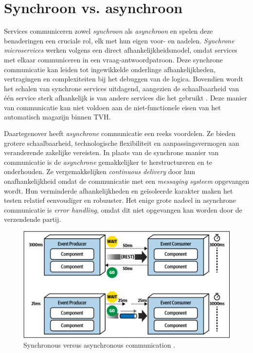 \section{Synchroon vs. asynchroon}
Services communiceren zowel \emph{synchroon} als \emph{asynchroon} en spelen deze benaderingen een cruciale rol, 
elk met hun eigen voor- en nadelen. \emph{Synchrone microservices} werken volgens een direct 
afhankelijkheidsmodel, omdat services met elkaar communiceren in een vraag-antwoordpatroon. 
Deze synchrone communicatie kan leiden tot ingewikkelde onderlinge afhankelijkheden, vertragingen en complexiteiten bij het debuggen 
van de logica. Bovendien wordt het schalen van synchrone services uitdagend, 
aangezien de schaalbaarheid van één service sterk afhankelijk is van andere services die het gebruikt \autocite{Bellemare2020}. 
Deze manier van communicatie kan niet voldoen aan de niet-functionele eisen van het automatisch magazijn binnen TVH.
\newline

Daartegenover heeft \emph{asynchrone} communicatie een reeks voordelen. Ze bieden grotere schaalbaarheid, technologische 
flexibiliteit en aanpassingsvermogen aan veranderende zakelijke vereisten. 
In plaats van de synchrone manier van communicatie is de \emph{asynchrone} gemakkelijker te herstructureren en te onderhouden. 
Ze vergemakkelijken \emph{continuous delivery} door hun onafhankelijkheid omdat de communicatie 
met een \emph{messaging systeem} opgevangen wordt. 
Hun verminderde afhankelijkheden en geïsoleerde karakter maken het testen relatief eenvoudiger en robuuster.
Het enige grote nadeel in asynchrone communicatie is \emph{error handling}, 
omdat dit niet opgevangen kan worden door de verzendende partij.
\newline

\begin{figure}[h!]
  \centering
  \includegraphics[width=.5\textwidth]{../voorstel/img/synchronous_vs_async_calls.png}
  \caption{\label{fig:sync-vs-async}Synchronous versus asynchronous communication \autocite[figure 14 -- 13]{MarkRichards2021}.}
\end{figure}

